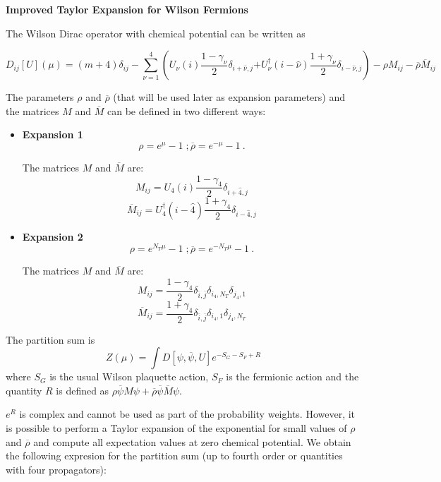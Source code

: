 \documentclass[a4paper,10pt]{report}
\newcommand{\ol}[1]{\overline{#1}}
\newcommand{\h}[1]{\hat{#1}}
\newcommand{\rrb}{\overline{\rho}}
\newcommand{\rr}{\rho}
\newcommand{\emu}{e^{\mu}}
\newcommand{\emmu}{e^{-\mu}}
\newcommand{\Mb}{\ol{M}}
\begin{document}
\begin{center}
{\bf \Large Improved Taylor Expansion for Wilson Fermions} 
\end{center}

\vspace*{10mm}

\noindent The Wilson Dirac operator with chemical potential can be written as

$$
D_{ij}[U](\mu) = (m+4)\delta_{ij} - \sum_{\nu=1}^4 \left( U_\nu(i) \frac{1-\gamma_\nu}{2}\delta_{i+\h{\nu},j} \right.
\left. + U^\dagger_\nu(i-\h{\nu})\frac{1+\gamma_\nu}{2}\delta_{i-\h{\nu},j} \right) - \rr M_{ij} - \rrb \Mb_{ij}
$$

\noindent The parameters $\rr$ and $\rrb$ (that will be used later as expansion
parameters) and the matrices $M$ and $\Mb$
can be defined in two different ways:

\begin{itemize}
\item {\bf Expansion 1}
$$\rr = \emu - 1 \; ;  \rrb = \emmu - 1 \ .$$

\noindent The matrices $M$ and $\Mb$ are:
$$M_{ij} = U_4(i) \frac{1-\gamma_4}{2}\delta_{i+\h{4},j}$$
$$\Mb_{ij} = U_4^\dagger(i-\h{4}) \frac{1+\gamma_4}{2}\delta_{i-\h{4},j}$$

\item {\bf Expansion 2}
$$\rr = e^{N_T\mu} - 1 \; ; \rrb = e^{-N_T\mu} - 1 \ .$$

\noindent The matrices $M$ and $\Mb$ are:
$$M_{ij} = \frac{1-\gamma_4}{2}\delta_{\ol{i},\ol{j}}\delta_{i_4,N_T}\delta_{j_4,1}$$
$$\Mb_{ij} = \frac{1+\gamma_4}{2}\delta_{\ol{i},\ol{j}}\delta_{i_4,1}\delta_{j_4,N_T}$$

\end{itemize}

\noindent The partition sum is
\begin{equation}
 Z(\mu) = \int D[\psi,\ol{\psi},U] e^{-S_G - S_F + R}
\end{equation}
\noindent where $S_G$ is the usual Wilson plaquette action, $S_F$ is the fermionic
action and the quantity $R$ is defined as $\rr \ol{\psi}M\psi + \rrb \ol{\psi}\Mb \psi$.

\vspace*{2mm}
\noindent $e^R$ is complex and cannot be used as part of the probability weights.  
However, it is possible to perform a Taylor expansion of the exponential
for small values of $\rr$ and $\rrb$ and compute all expectation values at zero
chemical potential.  We obtain the following expresion for the partition sum
(up to fourth order or quantities with four propagators):
\end{document}
